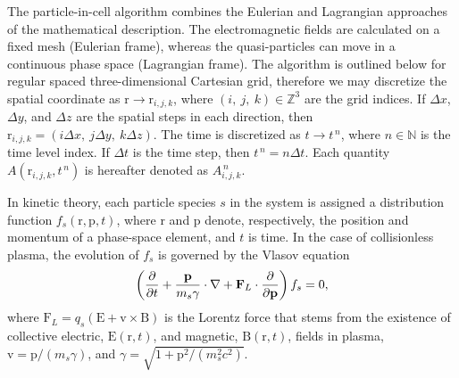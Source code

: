 \documentclass[10pt, a4paper, twoside, openright]{report}
\renewcommand{\vec}[1]{\boldsymbol{\mathrm{#1}}}
\begin{document}
The particle-in-cell algorithm combines the Eulerian and Lagrangian approaches of the mathematical description. The electromagnetic fields are calculated on a fixed mesh (Eulerian frame), whereas the quasi-particles can move in a continuous phase space (Lagrangian frame). The algorithm is outlined below for regular spaced three-dimensional Cartesian grid, therefore we may discretize the spatial coordinate as $ \vec{r} \rightarrow \vec{r}_{i, j, k} $, where $ (i, \ j, \ k) \in \mathbb{Z}^{3} $ are the grid indices. If $ \Delta x $, $ \Delta y $, and $ \Delta z $ are the spatial steps in each direction, then $ \vec{r}_{i, j, k} = \left( i \Delta x, \ j \Delta y, \ k \Delta z \right) $. The time is discretized as $ t \rightarrow t^{\,n} $, where $ n \in \mathbb{N} $ is the time level index. If $ \Delta t $ is the time step, then $ t^{\,n} = n \Delta t $. Each quantity $ A \left(\vec{r}_{i, j, k}, t^{\,n} \right) $ is hereafter denoted as $ A_{i, j, k}^{\,n} $.


In kinetic theory, each particle species $ s $ in the system is assigned a distribution function $ f_{s} \left( \vec{r}, \vec{p}, t \right) $, where $ \vec{r} $ and $ \vec{p} $ denote, respectively, the position and momentum of a phase-space element, and $ t $ is time. In the case of collisionless plasma, the evolution of $ f_{s} $ is governed by the Vlasov equation
\begin{equation}\label{eq:vlasov_eq}
	\left( \diffp[]{}{t} + \frac{\vec{p}}{m_s \gamma} \cdot \nabla + \vec{F}_L \cdot \frac{\partial}{\partial \vec{p}} \right) f_s = 0,
\end{equation}
where $ \vec{F}_L = q_s \left( \vec{E} + \vec{v} \times \vec{B} \right) $ is the Lorentz force that stems from the existence of collective electric, $ \vec{E} \left( \vec{r}, t \right) $, and magnetic, $ \vec{B} \left( \vec{r}, t \right) $, fields in plasma, $ \vec{v} = \vec{p} / \left( m_s \gamma \right) $, and $ \gamma = \sqrt{1 + \vec{p}^2 / \left( m_s^2 c^2 \right)} $.
\end{document}
